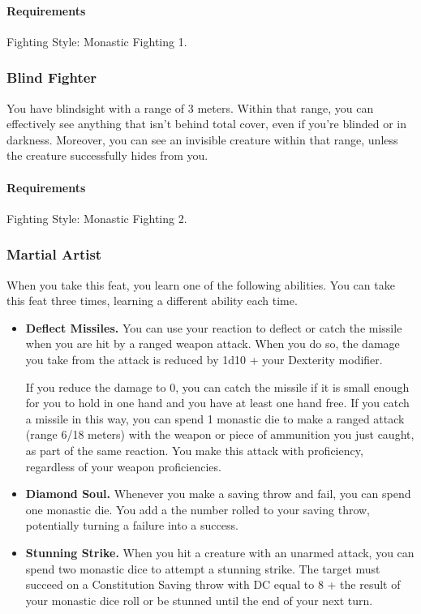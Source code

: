     \paragraph{Requirements} Fighting Style: Monastic Fighting 1.
\subsubsection{Blind Fighter} \label{feat::blindfighter}
    You have blindsight with a range of 3 meters.
    Within that range, you can effectively see anything that isn't behind total cover, even if you're blinded or in darkness.
    Moreover, you can see an invisible creature within that range, unless the creature successfully hides from you.
    \paragraph{Requirements} Fighting Style: Monastic Fighting 2.
\subsubsection{Martial Artist} \label{feat::martialartist}
    When you take this feat, you learn one of the following abilities.
    You can take this feat three times, learning a different ability each time.
    \begin{itemize}
        \item \textbf{Deflect Missiles.} You can use your reaction to deflect or catch the missile when you are hit by a ranged weapon attack.
        When you do so, the damage you take from the attack is reduced by 1d10 + your Dexterity modifier.

        If you reduce the damage to 0, you can catch the missile if it is small enough for you to hold in one hand and you have at least one hand free.
        If you catch a missile in this way, you can spend 1 monastic die to make a ranged attack (range 6/18 meters) with the weapon or piece of ammunition you just caught, as part of the same reaction.
        You make this attack with proficiency, regardless of your weapon proficiencies.

        \item \textbf{Diamond Soul.} Whenever you make a saving throw and fail, you can spend one monastic die.
        You add a the number rolled to your saving throw, potentially turning a failure into a success.

        \item \textbf{Stunning Strike.} When you hit a creature with an unarmed attack, you can spend two monastic dice to attempt a stunning strike.
        The target must succeed on a Constitution Saving throw with DC equal to 8 + the result of your monastic dice roll or be stunned until the end of your next turn.
    \end{itemize}

